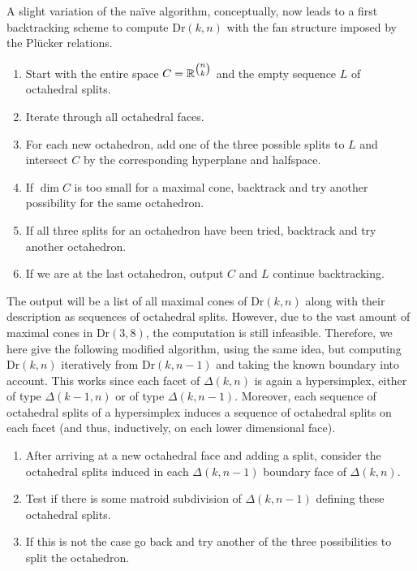 \documentclass[11pt,a4paper]{amsart}
\newcommand{\RR}{{\mathbb{R}}}
\newcommand{\Hypersimplex}[2]{{\Delta(#1,#2)}}
\newcommand{\Dr}[2]{{\mathrm{Dr}(#1,#2)}}
\theoremstyle{plain}
\theoremstyle{definition}
\begin{document}
A slight variation of the na\"ive algorithm, conceptually, now leads to a first backtracking scheme
to compute $\Dr{k}{n}$ with the fan structure imposed by the Pl\"ucker relations.

\begin{enumerate}
\item Start with the entire space $C=\RR^{\tbinom nk}$ and the empty sequence $L$ of
    octahedral splits.
\item Iterate through all octahedral faces.
\item For each new octahedron, add one of the three
    possible splits to $L$ and intersect $C$ by the corresponding hyperplane and halfspace.
\item If $\dim C$ is too small for a maximal cone, backtrack and try another possibility
    for the same octahedron.
\item If all three splits for an octahedron have been tried, backtrack and try another
    octahedron.
\item If we are at the last octahedron, output $C$ and $L$ continue backtracking.
\end{enumerate}

The output will be a list of all maximal cones of $\Dr{k}{n}$ along with their description as
sequences of octahedral splits. However, due to the vast amount of maximal cones in $\Dr{3}{8}$, the
computation is still infeasible. Therefore, we here give the following modified algorithm, using the
same idea, but computing $\Dr{k}{n}$ iteratively from $\Dr{k}{n-1}$ and taking the known boundary
into account.  This works since each facet of $\Hypersimplex{k}{n}$ is again a hypersimplex, either of type
$\Delta(k-1,n)$ or of type $\Delta(k,n-1)$.  Moreover, each sequence of octahedral splits of a
hypersimplex induces a sequence of octahedral splits on each facet (and thus, inductively, on each
lower dimensional face).

\begin{enumerate}
\item After arriving at a new octahedral face and adding a split, consider the octahedral splits
  induced in each $\Hypersimplex{k}{n-1}$ boundary face of $\Hypersimplex{k}{n}$.
\item Test if there is some matroid subdivision of $\Hypersimplex{k}{{n-1}}$ defining these octahedral splits.
\item If this is not the case go back and try another of the three possibilities to split the octahedron.
\end{enumerate}
\end{document}
